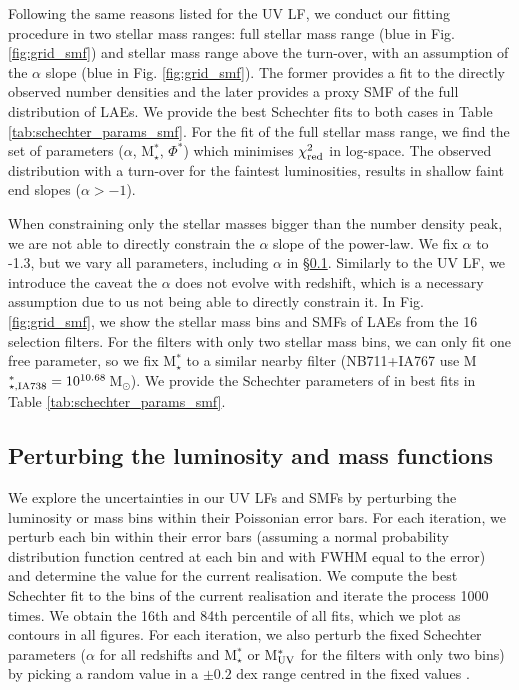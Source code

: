 \documentclass[a4paper,fleqn,usenatbib]{mnras}
\begin{document}
Following the same reasons listed for the UV LF, we conduct our fitting procedure in two stellar mass ranges: full stellar mass range (blue in Fig. \ref{fig:grid_smf}) and stellar mass range above the turn-over, with an assumption of the $\alpha$ slope (blue in Fig. \ref{fig:grid_smf}). The former provides a fit to the directly observed number densities and the later provides a proxy SMF of the full distribution of LAEs. We provide the best Schechter fits to both cases in Table \ref{tab:schechter_params_smf}. For the fit of the full stellar mass range, we find the set of parameters ($\alpha$, M$_\star^*$, $\Phi^*$) which minimises $\chi^2_{\rm red}$ in log-space. The observed distribution with a turn-over for the faintest luminosities, results in shallow faint end slopes ($\alpha>-1$).

When constraining only the stellar masses bigger than the number density peak, we are not able to directly constrain the $\alpha$ slope of the power-law. We fix $\alpha$ to -1.3, but we vary all parameters, including $\alpha$ in \S\ref{subsec:perturb_fits}. Similarly to the UV LF, we introduce the caveat the $\alpha$ does not evolve with redshift, which is a necessary assumption due to us not being able to directly constrain it. In Fig. \ref{fig:grid_smf}, we show the stellar mass bins and SMFs of LAEs from the 16 selection filters. For the filters with only two stellar mass bins, we can only fit one free parameter, so we fix M$_\star^*$ to a similar nearby filter (NB711+IA767 use M$_{\rm \star, IA738}^*=10^{10.68}$\,M$_\odot$). We provide the Schechter parameters of in best fits in Table \ref{tab:schechter_params_smf}.


\subsection{Perturbing the luminosity and mass functions} \label{subsec:perturb_fits}
We explore the uncertainties in our UV LFs and SMFs by perturbing the luminosity or mass bins within their Poissonian error bars. For each iteration, we perturb each bin within their error bars (assuming a normal probability distribution function centred at each bin and with FWHM equal to the error) and determine the value for the current realisation. We compute the best Schechter fit to the bins of the current realisation and iterate the process 1000 times. We obtain the 16th and 84th percentile of all fits, which we plot as contours in all figures. For each iteration, we also perturb the fixed Schechter parameters ($\alpha$ for all redshifts and M$_\star^*$ or M$_{\rm UV}^*$ for the filters with only two bins) by picking a random value in a $\pm0.2$ dex range centred in the fixed values \citep[same method as][]{Sobral2018}.
\end{document}
